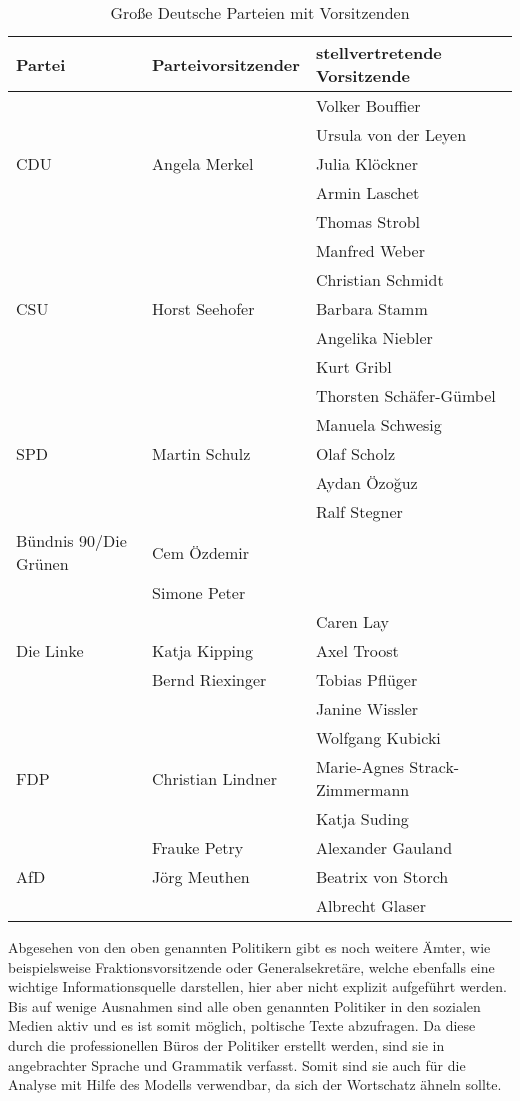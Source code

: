 \begin{table}
\begin{tabular}{lll}
\hline
Partei & Parteivorsitzender & stellvertretende Vorsitzende \\
\hline
& & Volker Bouffier \\
& & Ursula von der Leyen \\
CDU & Angela Merkel & Julia Klöckner \\
& & Armin Laschet\\
& & Thomas Strobl \\
\hline
& & Manfred Weber \\
& & Christian Schmidt \\
CSU & Horst Seehofer &  Barbara Stamm \\
& & Angelika Niebler\\
& & Kurt Gribl \\
\hline
& & Thorsten Schäfer-Gümbel \\
& & Manuela Schwesig \\
SPD & Martin Schulz & Olaf Scholz\\
& & Aydan Özoğuz\\
& & Ralf Stegner \\
\hline
Bündnis 90/Die Grünen & Cem Özdemir \\
& Simone Peter & \\
\hline
& & Caren Lay \\
Die Linke & Katja Kipping & Axel Troost\\
& Bernd Riexinger & Tobias Pflüger \\
& & Janine Wissler \\
\hline
& & Wolfgang Kubicki \\
FDP & Christian Lindner & Marie-Agnes Strack-Zimmermann\\
& & Katja Suding \\
\hline
& Frauke Petry & Alexander Gauland \\
AfD & Jörg Meuthen & Beatrix von Storch \\
& & Albrecht Glaser \\
\hline
\end{tabular}
\caption{Große Deutsche Parteien mit Vorsitzenden}
\end{table}
Abgesehen von den oben genannten Politikern gibt es noch weitere Ämter, wie beispielsweise Fraktionsvorsitzende oder Generalsekretäre, welche ebenfalls eine wichtige Informationsquelle darstellen, hier aber nicht explizit aufgeführt werden. Bis auf wenige Ausnahmen sind alle oben genannten Politiker in den sozialen Medien aktiv und es ist somit möglich, poltische Texte abzufragen. Da diese durch die professionellen Büros der Politiker erstellt werden, sind sie in angebrachter Sprache und Grammatik verfasst. Somit sind sie auch für die Analyse mit Hilfe des Modells verwendbar, da sich der Wortschatz ähneln sollte.
